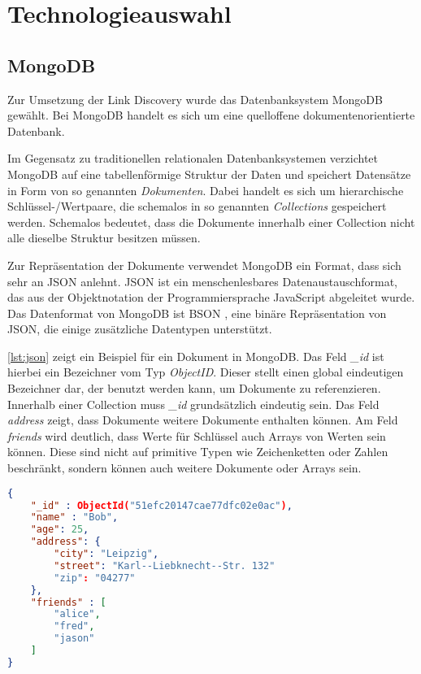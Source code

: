 \section{Technologieauswahl}

\subsection{MongoDB}
\label{mongo}

Zur Umsetzung der Link Discovery wurde das Datenbanksystem MongoDB \cite{mo2013} gewählt. Bei MongoDB handelt es sich um eine quelloffene dokumentenorientierte Datenbank.

Im Gegensatz zu traditionellen relationalen Datenbanksystemen verzichtet MongoDB auf eine tabellenförmige Struktur der Daten und speichert Datensätze in Form von so genannten \emph{Dokumenten}. Dabei handelt es sich um hierarchische Schlüssel-/Wertpaare, die schemalos in so genannten \emph{Collections} gespeichert werden. Schemalos bedeutet, dass die Dokumente innerhalb einer Collection nicht alle dieselbe Struktur besitzen müssen.

Zur Repräsentation der Dokumente verwendet MongoDB ein Format, dass sich sehr an JSON \cite{json2006} anlehnt. JSON ist ein menschenlesbares Datenaustauschformat, das aus der Objektnotation der Programmiersprache JavaScript abgeleitet wurde. Das Datenformat von MongoDB ist BSON \cite{bson2013}, eine binäre Repräsentation von JSON, die einige zusätzliche Datentypen unterstützt. 

\cref{lst:json} zeigt ein Beispiel für ein Dokument in MongoDB. Das Feld \emph{\_id} ist hierbei ein  Bezeichner vom Typ \emph{ObjectID}. Dieser stellt einen global eindeutigen Bezeichner dar, der benutzt werden kann, um Dokumente zu referenzieren. Innerhalb einer Collection muss \emph{\_id} grundsätzlich eindeutig sein. Das Feld \emph{address} zeigt, dass Dokumente weitere Dokumente enthalten können. Am Feld \emph{friends} wird deutlich, dass Werte für Schlüssel auch Arrays von Werten sein können. Diese sind nicht auf primitive Typen wie Zeichenketten oder Zahlen beschränkt, sondern können auch weitere Dokumente oder Arrays sein.

\begin{lstlisting}[language=json, label={lst:json}, caption={Ein Beispiel für ein Dokument in MongoDB}]
{
    "_id" : ObjectId("51efc20147cae77dfc02e0ac"),
    "name" : "Bob",
    "age": 25,
    "address": {
        "city": "Leipzig",
        "street": "Karl--Liebknecht--Str. 132"
        "zip": "04277"
    },
    "friends" : [
        "alice",
        "fred",
        "jason"
    ]
}
\end{lstlisting}

